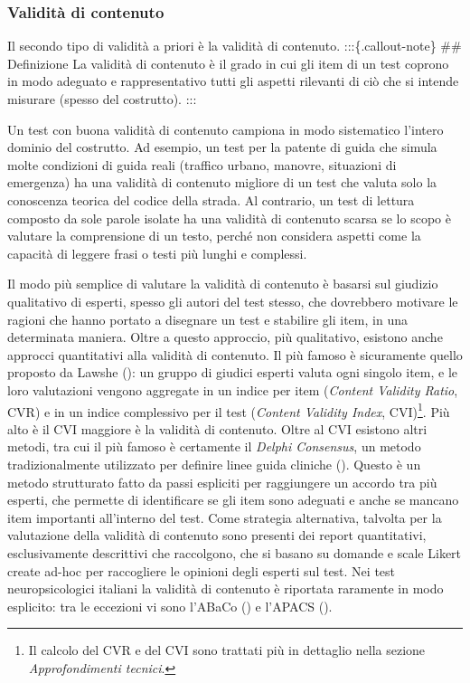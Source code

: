 \documentclass[
  italian,
  letterpaper,
  paper=A4,
  headinclude=on,
  footinclude=on,
  12pt]{scrbook}
\begin{document}
\subsubsection{Validità di contenuto}\label{validituxe0-di-contenuto}

Il secondo tipo di validità a priori è la validità di contenuto.
:::\{.callout-note\} \#\# Definizione La validità di contenuto è il
grado in cui gli item di un test coprono in modo adeguato e
rappresentativo tutti gli aspetti rilevanti di ciò che si intende
misurare (spesso del costrutto). :::

Un test con buona validità di contenuto campiona in modo sistematico
l'intero dominio del costrutto. Ad esempio, un test per la patente di
guida che simula molte condizioni di guida reali (traffico urbano,
manovre, situazioni di emergenza) ha una validità di contenuto migliore
di un test che valuta solo la conoscenza teorica del codice della
strada. Al contrario, un test di lettura composto da sole parole isolate
ha una validità di contenuto scarsa se lo scopo è valutare la
comprensione di un testo, perché non considera aspetti come la capacità
di leggere frasi o testi più lunghi e complessi.

Il modo più semplice di valutare la validità di contenuto è basarsi sul
giudizio qualitativo di esperti, spesso gli autori del test stesso, che
dovrebbero motivare le ragioni che hanno portato a disegnare un test e
stabilire gli item, in una determinata maniera. Oltre a questo
approccio, più qualitativo, esistono anche approcci quantitativi alla
validità di contenuto. Il più famoso è sicuramente quello proposto da
Lawshe (\citeyear{lawshe1975quantitative}): un gruppo di giudici esperti
valuta ogni singolo item, e le loro valutazioni vengono aggregate in un
indice per item (\emph{Content Validity Ratio}, CVR) e in un indice
complessivo per il test (\emph{Content Validity Index}, CVI)\footnote{Il
  calcolo del CVR e del CVI sono trattati più in dettaglio nella sezione
  \emph{Approfondimenti tecnici}.}. Più alto è il CVI maggiore è la
validità di contenuto. Oltre al CVI esistono altri metodi, tra cui il
più famoso è certamente il \emph{Delphi Consensus}, un metodo
tradizionalmente utilizzato per definire linee guida cliniche
(\cite{devries2018screening}). Questo è un metodo strutturato fatto da
passi espliciti per raggiungere un accordo tra più esperti, che permette
di identificare se gli item sono adeguati e anche se mancano item
importanti all'interno del test. Come strategia alternativa, talvolta
per la valutazione della validità di contenuto sono presenti dei report
quantitativi, esclusivamente descrittivi che raccolgono, che si basano
su domande e scale Likert create ad-hoc per raccogliere le opinioni
degli esperti sul test. Nei test neuropsicologici italiani la validità
di contenuto è riportata raramente in modo esplicito: tra le eccezioni
vi sono l'ABaCo (\cite{sacco2008abaco}) e l'APACS
(\cite{arcara2016apacs}).
\end{document}
